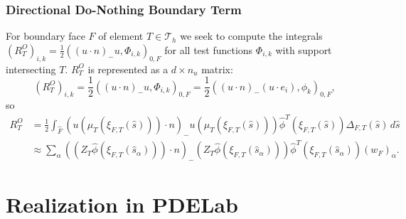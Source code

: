 \documentclass[a4paper,12pt]{article}
\theoremstyle{definition}
\begin{document}
\subsubsection*{Directional Do-Nothing Boundary Term}

For boundary face $F$ of element $T\in\mathcal{T}_h$ we seek to compute the integrals 
$(R^{O}_T)_{i,k} = \frac12 ( (u\cdot n)_-u, \Phi_{i,k})_{0,F}$ for all test functions $\Phi_{i,k}$
with support intersecting $T$. $R^{O}_T$ is represented as a $d\times n_u$ matrix:
\begin{equation*}
(R^{O}_T)_{i,k} = \frac12 ( (u\cdot n)_-u  , \Phi_{i,k})_{0,F} = \frac12 ( (u\cdot n)_- (u\cdot e_i), \phi_{k} )_{0,F} ,
\end{equation*}
so
\begin{equation}
\begin{split}
R^{O}_T &= \frac12 \int_{\hat F} (u(\mu_T(\xi_{F,T}(\hat s)))\cdot n)_- u(\mu_T(\xi_{F,T}(\hat s)))  \hat\phi^T(\xi_{F,T}(\hat s)) \Delta_{F,T}(\hat s) \,d\hat s\\
&\approx \sum_\alpha ( (Z_T \hat\phi(\xi_{F,T}(\hat s_\alpha))) \cdot n)_- (Z_T \hat\phi(\xi_{F,T}(\hat s_\alpha))) \hat\phi^T(\xi_{F,T}(\hat s_\alpha))  (w_F)_\alpha .
\end{split}
\end{equation}

\section{Realization in PDELab}
\end{document}
